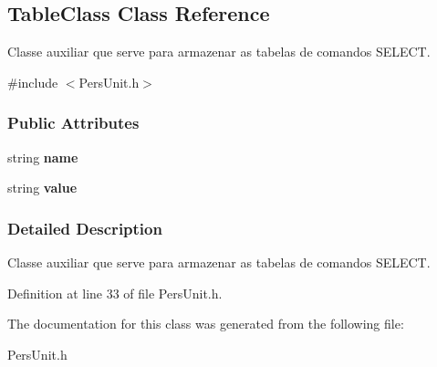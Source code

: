 \hypertarget{classTableClass}{\subsection{Table\-Class Class Reference}
\label{d9/d75/classTableClass}
}


Classe auxiliar que serve para armazenar as tabelas de comandos S\-E\-L\-E\-C\-T.  




{\ttfamily \#include $<$Pers\-Unit.\-h$>$}

\subsubsection*{Public Attributes}
\begin{DoxyCompactItemize}
\item 
\hypertarget{classTableClass_a71f54c41c042c783b9ea98ec645f028a}{string {\bfseries name}}\label{d9/d75/classTableClass_a71f54c41c042c783b9ea98ec645f028a}

\item 
\hypertarget{classTableClass_a744c9d814d070d2e73307bd1143c6e68}{string {\bfseries value}}\label{d9/d75/classTableClass_a744c9d814d070d2e73307bd1143c6e68}

\end{DoxyCompactItemize}


\subsubsection{Detailed Description}
Classe auxiliar que serve para armazenar as tabelas de comandos S\-E\-L\-E\-C\-T. 

Definition at line 33 of file Pers\-Unit.\-h.



The documentation for this class was generated from the following file\-:\begin{DoxyCompactItemize}
\item 
Pers\-Unit.\-h\end{DoxyCompactItemize}
